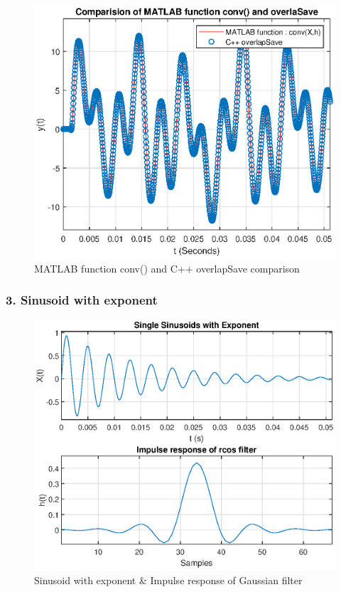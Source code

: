 \begin{figure}[h]
	\centering
	\includegraphics[width=12.5cm]{./algorithms/overlap_save/figures/mixed_signal2_conv_and_C++.eps}
	\caption{MATLAB function conv() and C++ overlapSave comparison}\label{mixed_signal2_conv_and_C++}
\end{figure}

\newpage

\subsubsection{3. Sinusoid with exponent}
\begin{figure}[h]
	\centering
	\includegraphics[width=12cm]{./algorithms/overlap_save/figures/sinusoid_with_exponent.eps}
	\caption{Sinusoid with exponent \& Impulse response of Gaussian filter}\label{sinusoid_with_exponent}
\end{figure}

